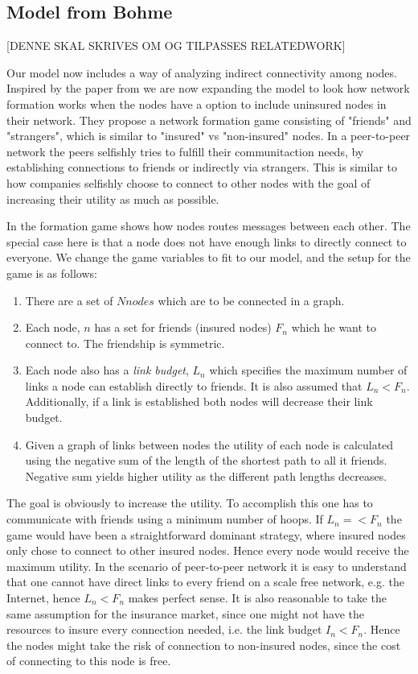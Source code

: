 \subsection{Model from Bohme}
[DENNE SKAL SKRIVES OM OG TILPASSES RELATEDWORK]



Our model now includes a way of analyzing indirect connectivity among nodes. Inspired by the paper from \cite{danezis2006network} we are now expanding the model to look how network formation works when the nodes have a option to include uninsured nodes in their network.  They propose a network formation game consisting of "friends" and "strangers", which is similar to "insured" vs "non-insured" nodes. 
In a peer-to-peer network the peers selfishly tries to fulfill their communitaction needs, by establishing connections to friends or indirectly via strangers. This is similar to how companies selfishly choose to connect to other nodes with the goal of increasing their utility as much as possible. 

In \cite{danezis2006network} the formation game shows how nodes routes messages between each other. The special case here is that a node does not have enough links to directly connect to everyone. We change the game variables to fit to our model, and the setup for the game is as follows:

\begin{enumerate}

\item There are a set of $N nodes$ which are to be connected in a graph.
\item Each node, $n$ has a set for friends (insured nodes) $F_{n}$ which he want to connect to. The friendship is symmetric.
\item Each node also has a \textit{link budget}, $L_{n}$ which specifies the maximum number of links a node can establish directly to friends. It is also assumed that $L_{n}<F_{n}$. Additionally, if a link is established both nodes will decrease their link budget.
\item Given a graph of links between nodes the utility of each node is calculated using the negative sum of the length of the shortest path to all it friends. Negative sum yields higher utility as the different path lengths decreases.
\end{enumerate}

The goal is obviously to increase the utility. To accomplish this one has to communicate with friends using a minimum number of hoops. If $L_{n}=<F_{n}$ the game would have been a straightforward dominant strategy, where insured nodes only chose to connect to other insured nodes. Hence every node would receive the maximum utility. In the scenario of peer-to-peer network it is easy to understand that one cannot have direct links to every friend on a scale free network, e.g. the Internet, hence $L_{n}<F_{n}$ makes perfect sense. It is also reasonable to take the same assumption  for the insurance market, since one might not have the resources to insure every connection needed, i.e. the link budget $I_{n} < F_{n}$. Hence the nodes might take the risk of connection to non-insured nodes, since the cost of connecting to this node is free.

